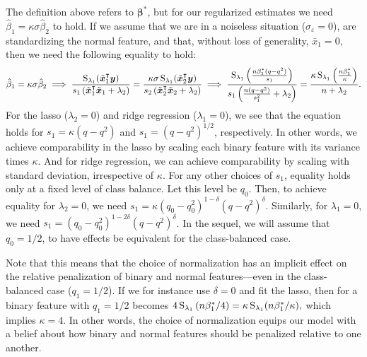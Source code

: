 The definition above refers to \(\bm{\beta}^*\), but for our regularized estimates we need
\(\hat{\beta}_1 = \kappa\sigma\hat{\beta}_2\) to hold. If we assume that we are in a
noiseless situation (\(\sigma_\varepsilon = 0\)), are standardizing the normal feature, and
that, without loss of generality, \(\bar{x}_1 = 0\), then we need the following equality to
hold:
%
\begin{equation}
  \label{eq:comparable-effects}
  \hat{\beta}_1 = \kappa\sigma \hat{\beta}_2 \implies \frac{\operatorname{S}_{\lambda_1}(\tilde{\bm{x}}_1^\intercal \bm{y})}{s_1\left(\tilde{\bm{x}}_1^\intercal \tilde{\bm{x}}_1 + \lambda_2\right)}  =\frac{\kappa\sigma \operatorname{S}_{\lambda_1}(\tilde{\bm{x}}_2^\intercal \bm{y})}{s_2\left(\tilde{\bm{x}}_2^\intercal \tilde{\bm{x}}_2 + \lambda_2\right)}  \implies \frac{\operatorname{S}_{\lambda_1}\left(\frac{n\beta_1^* (q - q^2)}{s_1}\right)}{s_1\left(\frac{n(q - q^2)}{s_1^2} + \lambda_2\right)} = \frac{\kappa \operatorname{S}_{\lambda_1}\left(\frac{n\beta_1^*}{\kappa} \right)}{n + \lambda_2}.
\end{equation}
For the lasso (\(\lambda_2 = 0\)) and ridge regression (\(\lambda_1=0\)), we see that the
equation holds for \(s_1 = \kappa (q - q^2)\) and \(s_1 = (q - q^2)^{1/2}\), respectively.
In other words, we achieve comparability in the lasso by scaling each binary feature with
its variance times \(\kappa\). And for ridge regression, we can achieve comparability by
scaling with standard deviation, irrespective of \(\kappa\). For any other choices of
\(s_1\), equality holds only at a fixed level of class balance. Let this level be \(q_0\).
Then, to achieve equality for \(\lambda_2 = 0\), we need \(s_1 =\kappa (q_0 - q_0^2)^{1 -
  \delta}(q - q^2)^\delta\). Similarly, for \(\lambda_1 = 0\), we need \(s_1 = (q_0 -
q_0^2)^{1 - 2\delta} (q - q^2)^\delta\). In the sequel, we will assume that \(q_0 = 1/2\),
to have effects be equivalent for the class-balanced case.

Note that this means that the choice of normalization has an implicit effect on the
relative penalization of binary and normal features---even in the class-balanced case
(\(q_1 = 1/2\)). If we for instance use \(\delta=0\) and fit the lasso, then
 for a binary feature with \(q_1=1/2\) becomes
\(4\operatorname{S}_{\lambda_1}\left(n\beta_1^*/4\right) = \kappa \operatorname{S}_{\lambda_1}(n\beta_1^*/\kappa ),\)
which implies \(\kappa = 4\). In other words, the choice of normalization equips our model
with a belief about how binary and normal features should be penalized relative to one
another.

